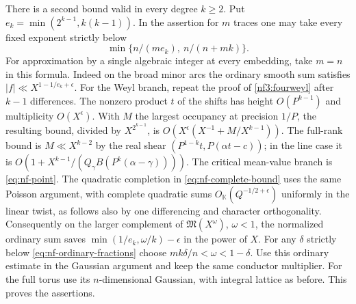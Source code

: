 \documentclass[11pt,letterpaper]{article}
\theoremstyle{definition}
\numberwithin{equation}{section}
\begin{document}
There is a second bound valid in every degree $k\ge2$. Put
$e_k=\min(2^{k-1},k(k-1))$. In the assertion for $m$ traces one may
take every fixed exponent strictly below
\begin{equation}\label{eq:nf-ordinary-fractions}
                  \min\{n/(me_k),\ n/(n+mk)\}.
\end{equation}
For approximation by a single algebraic integer at every embedding,
take $m=n$ in this formula. Indeed on the broad minor arcs the
ordinary smooth sum satisfies $|f|\ll X^{1-1/e_k+\epsilon}$.
For the Weyl branch, repeat the proof of \eqref{nf3:fourweyl}
after $k-1$ differences. The nonzero product $t$ of the shifts
has height $O(P^{k-1})$ and multiplicity $O(X^\epsilon)$.
With $M$ the largest occupancy at precision $1/P$, the resulting
bound, divided by $X^{2^{k-1}}$, is
$O(X^\epsilon(X^{-1}+M/X^{k-1}))$. The full-rank bound is
$M\ll X^{k-2}$ by the real shear
$(P^{1-k}t,P(\alpha t-c))$; in the line case it is
$O(1+X^{k-1}/(Q_\gamma B(P^k(\alpha-\gamma))))$.
The critical mean-value branch is \eqref{eq:nf-point}.
The quadratic completion in \eqref{eq:nf-complete-bound} uses
the same Poisson argument, with complete quadratic sums
$O_{\mathbb K}(Q^{-1/2+\epsilon})$ uniformly in the linear twist,
as follows also by one differencing and character orthogonality.
Consequently on the larger complement of $\mathfrak M(X^\omega)$,
$\omega<1$, the normalized ordinary sum saves
$\min(1/e_k,\omega/k)-\epsilon$ in the power of $X$.
For any $\delta$ strictly below \eqref{eq:nf-ordinary-fractions}
choose $mk\delta/n<\omega<1-\delta$. Use this ordinary estimate
in the Gaussian argument and keep the same conductor multiplier.
For the full torus use its $n$-dimensional Gaussian, with integral
lattice as before. This proves the assertions.
\end{document}
